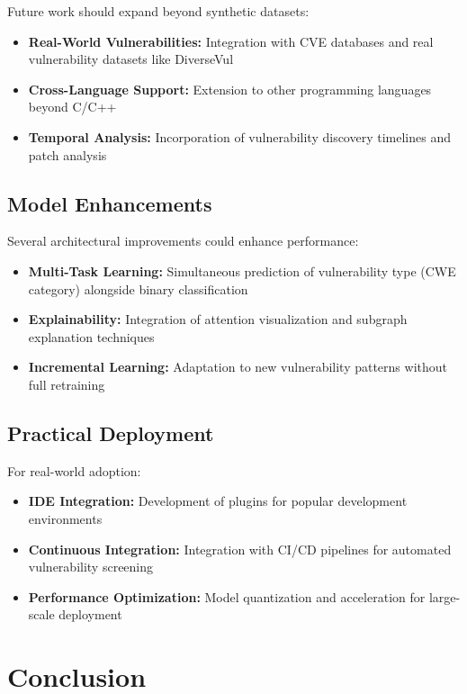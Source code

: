 Future work should expand beyond synthetic datasets:
\begin{itemize}
\item \textbf{Real-World Vulnerabilities:} Integration with CVE databases and real vulnerability datasets like DiverseVul
\item \textbf{Cross-Language Support:} Extension to other programming languages beyond C/C++
\item \textbf{Temporal Analysis:} Incorporation of vulnerability discovery timelines and patch analysis
\end{itemize}

\subsection{Model Enhancements}

Several architectural improvements could enhance performance:
\begin{itemize}
\item \textbf{Multi-Task Learning:} Simultaneous prediction of vulnerability type (CWE category) alongside binary classification
\item \textbf{Explainability:} Integration of attention visualization and subgraph explanation techniques
\item \textbf{Incremental Learning:} Adaptation to new vulnerability patterns without full retraining
\end{itemize}

\subsection{Practical Deployment}

For real-world adoption:
\begin{itemize}
\item \textbf{IDE Integration:} Development of plugins for popular development environments
\item \textbf{Continuous Integration:} Integration with CI/CD pipelines for automated vulnerability screening
\item \textbf{Performance Optimization:} Model quantization and acceleration for large-scale deployment
\end{itemize}

\section{Conclusion}

